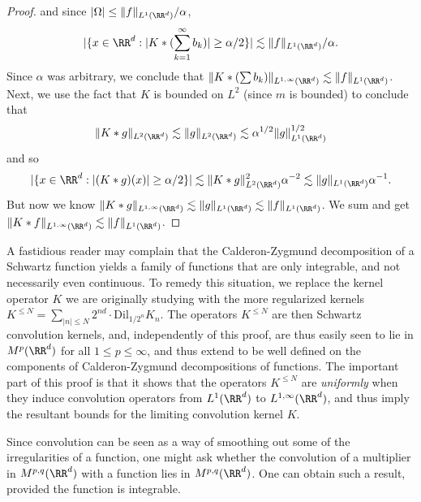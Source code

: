 \begin{proof}
  and since $|\Omega| \leq \| f \|_{L^1(\RR^d)} / \alpha$,
  \[ |\{ x \in \RR^d : |K * (\sum_{k = 1}^\infty b_k)| \geq \alpha/2 \}| \lesssim \| f \|_{L^1(\RR^d)} / \alpha. \]
  Since $\alpha$ was arbitrary, we conclude that $\| K * (\sum b_k) \|_{L^{1,\infty}(\RR^d)} \lesssim \| f \|_{L^1(\RR^d)}$. Next, we use the fact that $K$ is bounded on $L^2$ (since $m$ is bounded) to conclude that
  \[ \| K * g \|_{L^2(\RR^d)} \lesssim \| g \|_{L^2(\RR^d)} \lesssim \alpha^{1/2} \| g \|_{L^1(\RR^d)}^{1/2} \]
  and so
  \[ |\{ x \in \RR^d: |(K * g)(x)| \geq \alpha / 2 \}| \lesssim \| K * g \|_{L^2(\RR^d)}^2 \alpha^{-2} \lesssim \| g \|_{L^1(\RR^d)} \alpha^{-1}. \]
  But now we know $\| K * g \|_{L^{1,\infty}(\RR^d)} \lesssim \| g \|_{L^1(\RR^d)} \lesssim \| f \|_{L^1(\RR^d)}$. We sum and get $\| K * f \|_{L^{1,\infty}(\RR^d)} \lesssim \| f \|_{L^1(\RR^d)}$.
\end{proof}

\begin{remark}
    A fastidious reader may complain that the Calderon-Zygmund decomposition of a Schwartz function yields a family of functions that are only integrable, and not necessarily even continuous. To remedy this situation, we replace the kernel operator $K$ we are originally studying with the more regularized kernels $K^{\leq N} = \sum_{|n| \leq N} 2^{nd} \cdot \text{Dil}_{1/2^n} K_n$. The operators $K^{\leq N}$ are then Schwartz convolution kernels, and, independently of this proof, are thus easily seen to lie in $M^p(\RR^d)$ for all $1 \leq p \leq \infty$, and thus extend to be well defined on the components of Calderon-Zygmund decompositions of functions. The important part of this proof is that it shows that the operators $K^{\leq N}$ are \emph{uniformly} when they induce convolution operators from $L^1(\RR^d)$ to $L^{1,\infty}(\RR^d)$, and thus imply the resultant bounds for the limiting convolution kernel $K$.
\end{remark}

Since convolution can be seen as a way of smoothing out some of the irregularities of a function, one might ask whether the convolution of a multiplier in $M^{p,q}(\RR^d)$ with a function lies in $M^{p,q}(\RR^d)$. One can obtain such a result, provided the function is integrable.

